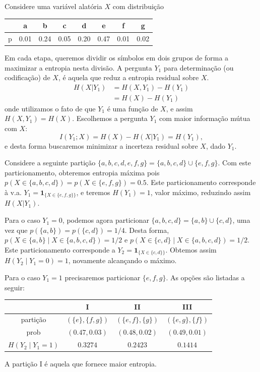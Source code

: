 \begin{example}
  Considere uma variável alatória $X$ com distribuição\\
  \begin{center}
  \begin{tabular}{c|c|c|c|c|c|c|c}
     & a    & b    & c    & d    & e    & f    & g \\ \hline
   p & 0.01 & 0.24 & 0.05 & 0.20 & 0.47 & 0.01 & 0.02
  \end{tabular}
  \end{center}

  Em cada etapa, queremos dividir os símbolos em dois grupos de forma a
  maximizar a entropia nesta divisão. A pergunta $Y_1$ para determinação 
  (ou codificação) de $X$, é aquela que reduz a entropia residual sobre $X$.
  \begin{subequations}
    \begin{align}
      H(X|Y_1) &= H(X,Y_1) - H(Y_1) \\
               &= H(X) - H(Y_1)
    \end{align}
  \end{subequations}
  onde utilizamos o fato de que $Y_1$ é uma função de $X$, e assim $H(X,Y_1) = H(X)$.
  Escolhemos a pergunta $Y_1$ com maior informação mútua com $X$:
  \begin{equation}
    I(Y_1 ; X) = H(X) - H(X|Y_1) = H(Y_1) ,
  \end{equation}
  e desta forma buscaremos minimizar a incerteza residual sobre $X$, dado $Y_1$.

  Considere a seguinte partição $\{a,b,c,d,e,f,g\} = \{a,b,c,d\} \cup \{e,f,g\}$.
  Com este particionamento, obteremos entropia máxima pois $p(X \in \{a,b,c,d\}) = p(X \in \{e,f,g\}) = 0.5$.
  Este particionamento corresponde à v.a. $Y_1 = \mathbf{1}_{\{X \in \{e,f,g\}\}}$, e
  teremos $H(Y_1) = 1$, valor máximo, reduzindo assim $H(X|Y_1)$.

  Para o caso $Y_1 = 0$, podemos agora particionar $\{a,b,c,d\} = \{a,b\} \cup \{c,d\}$,
  uma vez que $p(\{a,b\}) = p(\{c,d\}) = 1/4$. Desta forma, $p(X \in \{a,b\} \mid X \in \{a,b,c,d\}) = 1/2$ e
  $p(X \in \{c,d\} \mid X \in \{a,b,c,d\}) = 1/2$.
  Este particionamento corresponde a $Y_2 = \mathbf{1}_{\{X \in \{c,d\}\}}$. Obtemos assim $H(Y_2 \mid Y_1 = 0) = 1$,
  novamente alcançando o máximo.

  Para o caso $Y_1 = 1$ precisaremos particionar $\{e,f,g\}$. As opções são listadas a seguir:\\
  \begin{center}
    \begin{tabular}{c|c|c|c}
                 & I & II & III \\ \hline
        partição & $(\{e\},\{f,g\})$ & $(\{e,f\},\{g\})$ & $(\{e,g\},\{f\})$ \\ \hline
        prob     & $(0.47, 0.03)$ & $(0.48, 0.02)$ & $(0.49, 0.01)$ \\ \hline
        $H(Y_2 \mid Y_1 = 1)$ & $0.3274$ & $0.2423$ & $0.1414$
    \end{tabular}
  \end{center}
  A partição I é aquela que fornece maior entropia.


\end{example}
